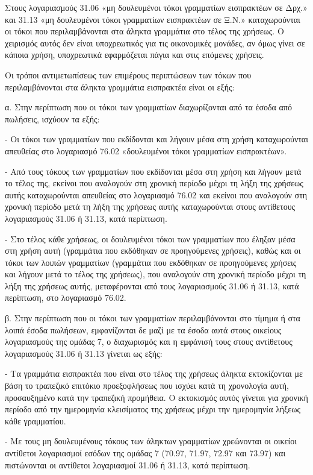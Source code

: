 \documentclass[A4,10pt,greek]{book}
\begin{document}
Στους λογαριασμούς 31.06 «μη δουλευμένοι τόκοι γραμματίων εισπρακτέων σε Δρχ.» και 31.13 «μη δουλευμένοι τόκοι γραμματίων εισπρακτέων σε Ξ.Ν.» καταχωρούνται οι τόκοι που περιλαμβάνονται στα άληκτα γραμμάτια στο τέλος της χρήσεως. Ο χειρισμός αυτός δεν είναι υποχρεωτικός για τις οικονομικές μονάδες, αν όμως γίνει σε κάποια χρήση, υποχρεωτικά εφαρμόζεται πάγια και στις επόμενες χρήσεις.

Οι τρόποι αντιμετωπίσεως των επιμέρους περιπτώσεων των τόκων που περιλαμβάνονται στα άληκτα γραμμάτια εισπρακτέα είναι οι εξής:

α. Στην περίπτωση που οι τόκοι των γραμματίων διαχωρίζονται από τα έσοδα από πωλήσεις, ισχύουν τα εξής:

- Οι τόκοι των γραμματίων που εκδίδονται και λήγουν μέσα στη χρήση καταχωρούνται απευθείας στο λογαριασμό 76.02 «δουλευμένοι τόκοι γραμματίων εισπρακτέων».

- Από τους τόκους των γραμματίων που εκδίδονται μέσα στη χρήση και λήγουν μετά το τέλος της, εκείνοι που αναλογούν στη χρονική περίοδο μέχρι τη λήξη της χρήσεως αυτής καταχωρούνται απευθείας στο λογαριασμό 76.02 και εκείνοι που αναλογούν στη χρονική περίοδο μετά τη λήξη της χρήσεως αυτής καταχωρούνται στους αντίθετους λογαριασμούς 31.06 ή 31.13, κατά περίπτωση.

- Στο τέλος κάθε χρήσεως, οι δουλευμένοι τόκοι των γραμματίων που έληξαν μέσα στη χρήση αυτή (γραμμάτια που εκδόθηκαν σε προηγούμενες χρήσεις), καθώς και οι τόκοι των λοιπών γραμματίων (γραμμάτια που εκδόθηκαν σε προηγούμενες χρήσεις και λήγουν μετά το τέλος της χρήσεως), που αναλογούν στη χρονική περίοδο μέχρι τη λήξη της χρήσεως αυτής, μεταφέρονται από τους λογαριασμούς 31.06 ή 31.13, κατά περίπτωση, στο λογαριασμό 76.02.

β. Στην περίπτωση που οι τόκοι των γραμματίων περιλαμβάνονται στο τίμημα ή στα λοιπά έσοδα πωλήσεων, εμφανίζονται δε μαζί με τα έσοδα αυτά στους οικείους λογαριασμούς της ομάδας 7, ο διαχωρισμός και η εμφάνισή τους στους αντίθετους λογαριασμούς 31.06 ή 31.13 γίνεται ως εξής:

- Τα γραμμάτια εισπρακτέα που είναι στο τέλος της χρήσεως άληκτα εκτοκίζονται με βάση το τραπεζικό επιτόκιο προεξοφλήσεως που ισχύει κατά τη χρονολογία αυτή, προσαυξημένο κατά την τραπεζική προμήθεια. Ο εκτοκισμός αυτός γίνεται για χρονική περίοδο από την ημερομηνία κλεισίματος της χρήσεως μέχρι την ημερομηνία λήξεως κάθε γραμματίου.

- Με τους μη δουλευμένους τόκους των άληκτων γραμματίων χρεώνονται οι οικείοι αντίθετοι λογαριασμοί εσόδων της ομάδας 7 (70.97, 71.97, 72.97 και 73.97) και πιστώνονται οι αντίθετοι λογαριασμοί 31.06 ή 31.13, κατά περίπτωση.
\end{document}
